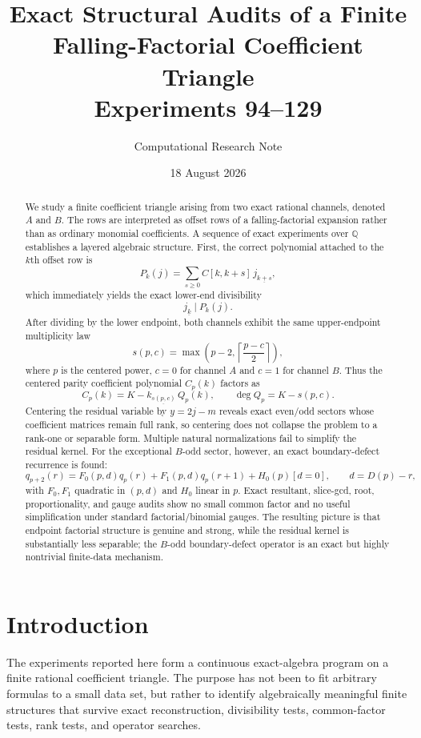 \documentclass[11pt,a4paper]{article}
\title{\textbf{Exact Structural Audits of a Finite Falling-Factorial Coefficient Triangle}\\[0.3em]
\large Experiments 94--129}
\author{Computational Research Note}
\date{18 August 2026}
\newcommand{\Q}{\mathbb{Q}}
\newcommand{\fall}[2]{#1_{\underline{#2}}}
\newcommand{\ceil}[1]{\left\lceil #1 \right\rceil}
\begin{document}
\maketitle
\begin{abstract}
We study a finite coefficient triangle arising from two exact rational channels, denoted $A$ and $B$.  The rows are interpreted as offset rows of a falling-factorial expansion rather than as ordinary monomial coefficients.  A sequence of exact experiments over $\Q$ establishes a layered algebraic structure.  First, the correct polynomial attached to the $k$th offset row is
\[
P_k(j)=\sum_{s\ge 0} C[k,k+s]\,\fall{j}{k+s},
\]
which immediately yields the exact lower-end divisibility
\[
\fall{j}{k}\mid P_k(j).
\]
After dividing by the lower endpoint, both channels exhibit the same upper-endpoint multiplicity law
\[
s(p,c)=\max\!\left(p-2,\ceil{\frac{p-c}{2}}\right),
\]
where $p$ is the centered power, $c=0$ for channel $A$ and $c=1$ for channel $B$.  Thus the centered parity coefficient polynomial $C_p(k)$ factors as
\[
C_p(k)=\fall{K-k}{s(p,c)}\,Q_p(k),
\qquad \deg Q_p=K-s(p,c).
\]
Centering the residual variable by $y=2j-m$ reveals exact even/odd sectors whose coefficient matrices remain full rank, so centering does not collapse the problem to a rank-one or separable form.  Multiple natural normalizations fail to simplify the residual kernel.  For the exceptional $B$-odd sector, however, an exact boundary-defect recurrence is found:
\[
q_{p+2}(r)=F_0(p,d)q_p(r)+F_1(p,d)q_p(r+1)+H_0(p)[d=0],
\qquad d=D(p)-r,
\]
with $F_0,F_1$ quadratic in $(p,d)$ and $H_0$ linear in $p$.  Exact resultant, slice-gcd, root, proportionality, and gauge audits show no small common factor and no useful simplification under standard factorial/binomial gauges.  The resulting picture is that endpoint factorial structure is genuine and strong, while the residual kernel is substantially less separable; the $B$-odd boundary-defect operator is an exact but highly nontrivial finite-data mechanism.
\end{abstract}

\tableofcontents
\newpage

\section{Introduction}

The experiments reported here form a continuous exact-algebra program on a finite rational coefficient triangle.  The purpose has not been to fit arbitrary formulas to a small data set, but rather to identify algebraically meaningful finite structures that survive exact reconstruction, divisibility tests, common-factor tests, rank tests, and operator searches.
\end{document}
